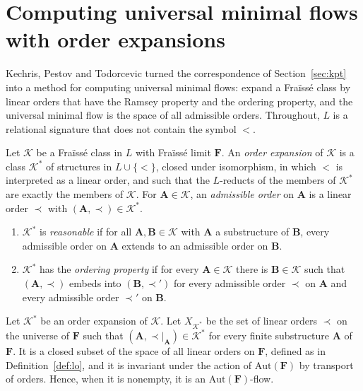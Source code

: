 \section{Computing universal minimal flows with order expansions}\label{sec:kpt-umf}

Kechris, Pestov and Todorcevic turned the correspondence of
Section~\ref{sec:kpt} into a method for computing universal minimal flows:
expand a Fraïssé class by linear orders that have the Ramsey property and
the ordering property, and the universal minimal flow is the space of all
admissible orders. Throughout, $L$ is a relational signature that does not
contain the symbol $<$.

\begin{definition}\label{def:order-expansion}
Let $\mathcal{K}$ be a Fraïssé class in $L$ with Fraïssé limit $\mathbf{F}$.
An \emph{order expansion} of $\mathcal{K}$ is a class $\mathcal{K}^*$ of
structures in $L\cup\{<\}$, closed under isomorphism, in which $<$ is
interpreted as a linear order, and such that the $L$-reducts of the members
of $\mathcal{K}^*$ are exactly the members of $\mathcal{K}$. For
$\mathbf{A}\in\mathcal{K}$, an \emph{admissible order} on $\mathbf{A}$ is a
linear order $\prec$ with $(\mathbf{A},\prec)\in\mathcal{K}^*$.
\begin{enumerate}
\item $\mathcal{K}^*$ is \emph{reasonable} if for all
  $\mathbf{A},\mathbf{B}\in\mathcal{K}$ with $\mathbf{A}$ a substructure of
  $\mathbf{B}$, every admissible order on $\mathbf{A}$ extends to an
  admissible order on $\mathbf{B}$.
\item $\mathcal{K}^*$ has the \emph{ordering property} if for every
  $\mathbf{A}\in\mathcal{K}$ there is $\mathbf{B}\in\mathcal{K}$ such that
  $(\mathbf{A},\prec)$ embeds into $(\mathbf{B},\prec')$ for every admissible
  order $\prec$ on $\mathbf{A}$ and every admissible order $\prec'$ on
  $\mathbf{B}$.
\end{enumerate}
\end{definition}

\begin{definition}\label{def:admissible-orders}
Let $\mathcal{K}^*$ be an order expansion of $\mathcal{K}$. Let
$X_{\mathcal{K}^*}$ be the set of linear orders $\prec$ on the universe of
$\mathbf{F}$ such that $(\mathbf{A},{\prec}|_{\mathbf{A}})\in\mathcal{K}^*$
for every finite substructure $\mathbf{A}$ of $\mathbf{F}$. It is a closed
subset of the space of all linear orders on $\mathbf{F}$, defined as in
Definition~\ref{def:lo}, and it is invariant under the action of
$\mathrm{Aut}(\mathbf{F})$ by transport of orders. Hence, when it is
nonempty, it is an $\mathrm{Aut}(\mathbf{F})$-flow.
\end{definition}


